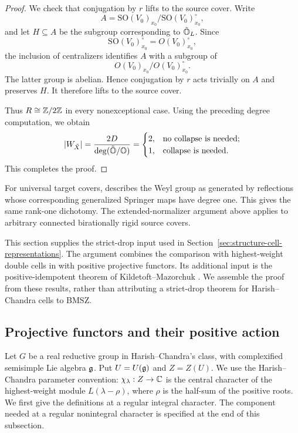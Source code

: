 \begin{proof}
  We check that conjugation by $r$ lifts
  to the source cover. Write
  \[
    A=
    \mathrm{SO}(V_0)_{x_0}/
    \mathrm{SO}(V_0)_{x_0}^{\circ},
  \]
  and let $H\subseteq A$ be the subgroup
  corresponding to $\tilde{\mathbb{O}}_L$.
  Since
  \[
    \mathrm{SO}(V_0)_{x_0}^{\circ}
    =
    O(V_0)_{x_0}^{\circ},
  \]
  the inclusion of centralizers identifies
  $A$ with a subgroup of
  \[
    O(V_0)_{x_0}/O(V_0)_{x_0}^{\circ}.
  \]
  The latter group is abelian.
  Hence conjugation by $r$ acts trivially
  on $A$ and preserves $H$.
  It therefore lifts to the source cover.

  Thus $R\cong\mathbb{Z}/2\mathbb{Z}$ in every nonexceptional
  case. Using the preceding degree computation,
  we obtain
  \[
    |W_{\tilde X}|
    =
    \frac{2D}{\deg(\tilde{\mathbb{O}}/\mathbb{O})}
    =
    \begin{cases}
      2,&\text{no collapse is needed};\\
      1,&\text{collapse is needed}.
    \end{cases}
  \]
  This completes the proof.
\end{proof}

For universal target covers, \cite[Corollary~18]{Namikawa2022CoverII}
describes the Weyl group as generated by reflections whose corresponding
generalized Springer maps have degree one. This gives the same rank-one
dichotomy. The extended-normalizer argument above applies to arbitrary
connected birationally rigid source covers.


\label{sec:strict-gk-drop}

This section supplies the strict-drop input used in
Section~\ref{sec:structure-cell-representations}. The argument combines the
comparison with highest-weight double cells in \cite{BMSZ22} with positive
projective functors. Its additional input is the positive-idempotent theorem
of Kildetoft--Mazorchuk \cite[Prop.~18]{KildetoftMazorchuk2016}. We assemble
the proof from these results, rather than attributing a strict-drop theorem
for Harish--Chandra cells to BMSZ.

\subsection{Projective functors and their positive action}
\label{subsec:strict-drop-projective-functors}

Let $G$ be a real reductive group in Harish--Chandra's class, with
complexified semisimple Lie algebra $\mathfrak{g}$. Put $U=U(\mathfrak{g})$ and $Z=Z(U)$.
We use the Harish--Chandra parameter convention: $\chi_\lambda:Z\to\mathbb{C}$
is the central character of the highest-weight module $L(\lambda-\rho)$,
where $\rho$ is the half-sum of the positive roots. We first give the
definitions at a regular integral character. The component needed at a
regular nonintegral character is specified at the end of this subsection.

